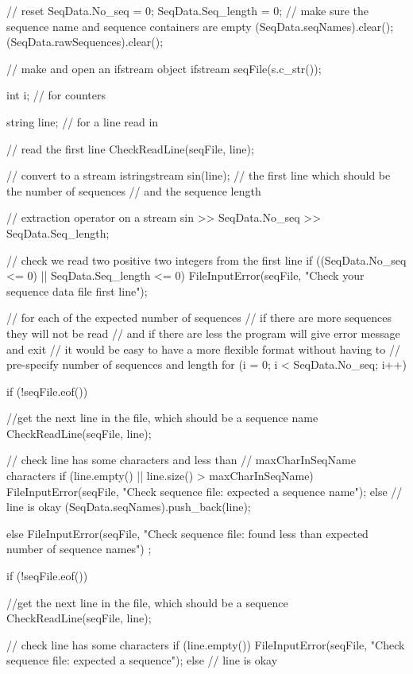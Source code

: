 \begin{DoxyCode}
{
  // reset
  SeqData.No_seq = 0;
  SeqData.Seq_length = 0;
  // make sure the sequence name and sequence containers are empty
  (SeqData.seqNames).clear();
  (SeqData.rawSequences).clear();

                    // make and open an ifstream object
  ifstream seqFile(s.c_str());

  int i;            // for counters

  string line;      // for a line read in

  // read the first line
  CheckReadLine(seqFile, line);

                    // convert to a stream
  istringstream sin(line);
  // the first line which should be the number of sequences 
  // and the sequence length

                    // extraction operator on a stream
  sin >> SeqData.No_seq >> SeqData.Seq_length;

  //  check we read two positive two integers from the first line
  if ((SeqData.No_seq <= 0) || SeqData.Seq_length <= 0)
  {
    FileInputError(seqFile, "Check your sequence data file first line");
  }

  // for each of the expected number of sequences
  // if there are more sequences they will not be read
  // and if there are less the program will give error message and exit
  // it would be easy to have a more flexible format without having to 
  // pre-specify number of sequences and length
  for (i = 0; i < SeqData.No_seq; i++)
  {
    if (!seqFile.eof())
    {
      //get the next line in the file, which should be a sequence name
      CheckReadLine(seqFile, line);

      // check line has some characters and less than 
      // maxCharInSeqName characters
      if (line.empty() || line.size() > maxCharInSeqName)
      {
        FileInputError(seqFile, 
                       "Check sequence file: expected a sequence name");
      }
      else          // line is okay
      {
        (SeqData.seqNames).push_back(line);
      }
    }
    else
    {
      FileInputError(seqFile, 
      "Check sequence file: found less than expected number of sequence names")
      ;
    }

    if (!seqFile.eof())
    {
      //get the next line in the file, which should be a sequence
      CheckReadLine(seqFile, line);

      // check line has some characters
      if (line.empty())
      {
        FileInputError(seqFile, "Check sequence file: expected a sequence");
      }
      else          // line is okay
      {

}}}}
\end{DoxyCode}
